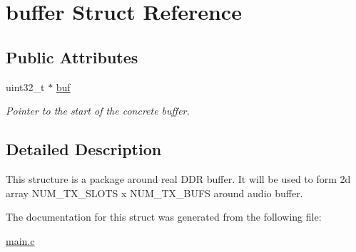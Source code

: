 \hypertarget{structbuffer}{\section{buffer Struct Reference}
\label{structbuffer}
}
\subsection*{Public Attributes}
\begin{DoxyCompactItemize}
\item 
\hypertarget{structbuffer_a5a8c5910df110dc4385c95359b1babae}{uint32\-\_\-t $\ast$ \hyperlink{structbuffer_a5a8c5910df110dc4385c95359b1babae}{buf}}\label{structbuffer_a5a8c5910df110dc4385c95359b1babae}

\begin{DoxyCompactList}\small\item\em Pointer to the start of the concrete buffer. \end{DoxyCompactList}\end{DoxyCompactItemize}


\subsection{Detailed Description}
This structure is a package around real D\-D\-R buffer. It will be used to form 2d array N\-U\-M\-\_\-\-T\-X\-\_\-\-S\-L\-O\-T\-S x N\-U\-M\-\_\-\-T\-X\-\_\-\-B\-U\-F\-S around audio buffer. 

The documentation for this struct was generated from the following file\-:\begin{DoxyCompactItemize}
\item 
\hyperlink{main_8c}{main.\-c}\end{DoxyCompactItemize}

